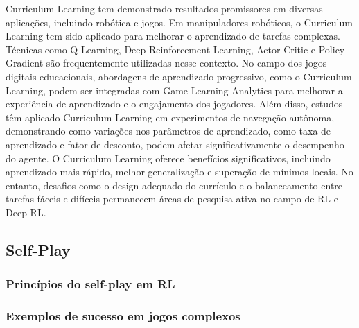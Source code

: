 Curriculum Learning tem demonstrado resultados promissores em diversas aplicações, incluindo robótica e jogos. Em manipuladores robóticos, o Curriculum Learning tem sido aplicado para melhorar o aprendizado de tarefas complexas. Técnicas como Q-Learning, Deep Reinforcement Learning, Actor-Critic e Policy Gradient são frequentemente utilizadas nesse contexto\cite{https://www.semanticscholar.org/paper/f11594e47ce3f5872bd4d4868f23655025bb6511}. No campo dos jogos digitais educacionais, abordagens de aprendizado progressivo, como o Curriculum Learning, podem ser integradas com Game Learning Analytics para melhorar a experiência de aprendizado e o engajamento dos jogadores\cite{https://www.semanticscholar.org/paper/704147ceaed752c17e5f24f9a3521c41cbfc9ff7}. Além disso, estudos têm aplicado Curriculum Learning em experimentos de navegação autônoma, demonstrando como variações nos parâmetros de aprendizado, como taxa de aprendizado e fator de desconto, podem afetar significativamente o desempenho do agente\cite{https://www.semanticscholar.org/paper/79d92c9a3e0de40d863e43232e2c00370412a841}. O Curriculum Learning oferece benefícios significativos, incluindo aprendizado mais rápido, melhor generalização e superação de mínimos locais. No entanto, desafios como o design adequado do currículo e o balanceamento entre tarefas fáceis e difíceis permanecem áreas de pesquisa ativa no campo de RL e Deep RL.

\subsection{Self-Play}
\label{subsec:self_play}

\subsubsection{Princípios do self-play em RL}
\label{subsubsec:self_play_principios}


\subsubsection{Exemplos de sucesso em jogos complexos}
\label{subsubsec:self_play_exemplos}


